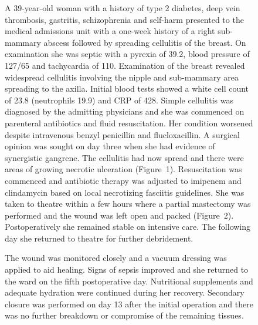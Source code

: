\begin{figure}[htbp]
\begin{ChSixFloatBody}

\centering

\begin{tcolorbox}

\begin{minipage}[t]{0.48\textwidth}\vspace{0pt}
\begin{tcolorbox}[
  enhanced,
  colback=blue!3,
  colframe=blue!60!black,
  title=\textbf{PMC3184014},
  fonttitle=\small,
  boxrule=0.8pt,
  arc=2mm,
  left=3mm,right=3mm,top=2mm,bottom=2mm
]
\footnotesize\raggedright
A 39-year-old woman with a history of type 2 diabetes, deep vein thrombosis, gastritis, schizophrenia and self-harm presented to the medical admissions unit with a one-week history of a right sub-mammary abscess followed by spreading cellulitis of the breast. On examination she was septic with a pyrexia of 39.2, blood pressure of 127/65 and tachycardia of 110. Examination of the breast revealed widespread cellulitis involving the nipple and sub-mammary area spreading to the axilla. Initial blood tests showed a white cell count of 23.8 (neutrophils 19.9) and CRP of 428. Simple cellulitis was diagnosed by the admitting physicians and she was commenced on parenteral antibiotics and fluid resuscitation. Her condition worsened despite intravenous benzyl penicillin and flucloxacillin. A surgical opinion was sought on day three when she had evidence of synergistic gangrene. The cellulitis had now spread and there were areas of growing necrotic ulceration (Figure~1). Resuscitation was commenced and antibiotic therapy was adjusted to imipenem and clindamycin based on local necrotizing fasciitis guidelines. She was taken to theatre within a few hours where a partial mastectomy was performed and the wound was left open and packed (Figure~2). Postoperatively she remained stable on intensive care. The following day she returned to theatre for further debridement.

The wound was monitored closely and a vacuum dressing was applied to aid healing. Signs of sepsis improved and she returned to the ward on the fifth postoperative day. Nutritional supplements and adequate hydration were continued during her recovery. Secondary closure was performed on day 13 after the initial operation and there was no further breakdown or compromise of the remaining tissues.


\end{tcolorbox}
\end{minipage}
\end{tcolorbox}
\end{ChSixFloatBody}
\end{figure}
